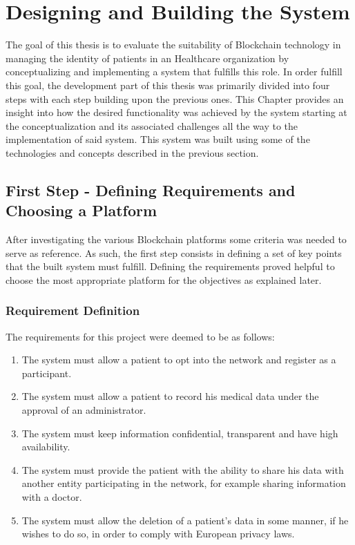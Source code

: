 \chapter{Designing and Building the System} \label{HLFHealthcare}  

The goal of this thesis is to evaluate the suitability of Blockchain technology
in managing the identity of patients in an Healthcare organization by
conceptualizing and implementing a system that fulfills this role. In order
fulfill this goal, the development part of this thesis was primarily divided
into four steps with each step building upon the previous ones. This Chapter
provides an insight into how the desired functionality was achieved by the
system starting at the conceptualization and its associated challenges all the
way to the implementation of said system. This system was built using some of
the technologies and concepts described in the previous section.

\section{First Step - Defining Requirements and Choosing a
Platform}\label{choosingHyperledger}

After investigating the various Blockchain platforms some criteria was needed
to serve as reference. As such, the first step consists in defining a set of
key points that the built system must fulfill. Defining the requirements proved
helpful to choose the most appropriate platform for the objectives as explained
later.

\subsection{Requirement Definition}
The requirements for this project were deemed to be as follows:

\renewcommand{\labelenumi}{\Roman{enumi}.}
\begin{enumerate}
  \item The system must allow a patient to opt into the network and register as
    a participant.
  \item The system must allow a patient to record his medical data under the
    approval of an administrator.
  \item The system must keep information confidential, transparent and have
    high availability.
  \item The system must provide the patient with the ability to share his data
    with another entity participating in the network, for example sharing
    information with a doctor.
  \item The system must allow the deletion of a patient's data in some manner,
    if he wishes to do so, in order to comply with European privacy laws.
\end{enumerate}


